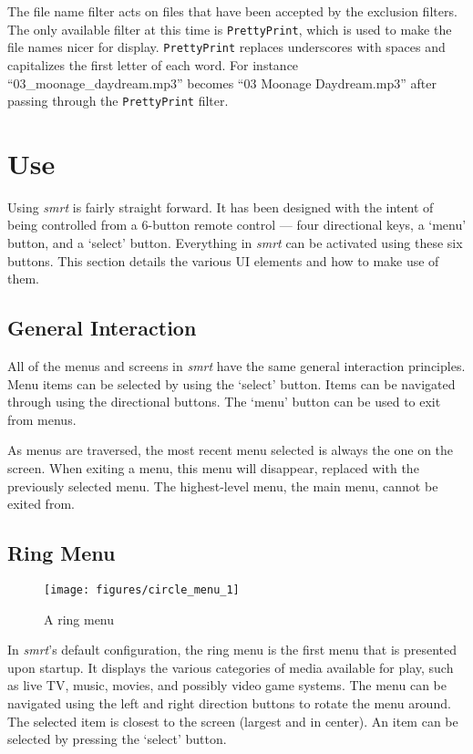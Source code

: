 \documentclass[letterpaper, titlepage, 11pt]{article}
\begin{document}
The file name filter acts on files that have been accepted by the exclusion
filters.  The only available filter at this time is \texttt{PrettyPrint}, which
is used to make the file names nicer for display.  \texttt{PrettyPrint}
replaces underscores with spaces and capitalizes the first letter of each word.
For instance ``03\_moonage\_daydream.mp3'' becomes ``03 Moonage Daydream.mp3''
after passing through the \texttt{PrettyPrint} filter.
  
\section{Use}
\label{sec:use}

Using \textit{smrt} is fairly straight forward.  It has been designed with the
intent of being controlled from a 6-button remote control --- four directional
keys, a `menu' button, and a `select' button.  Everything in \textit{smrt} can be
activated using these six buttons.  This section details the various UI elements
and how to make use of them.

\subsection{General Interaction}
All of the menus and screens in \textit{smrt} have the same general interaction
principles.  Menu items can be selected by using the `select' button.  Items
can be navigated through using the directional buttons.  The `menu' button can
be used to exit from menus.

As menus are traversed, the most recent menu selected is always the one on the
screen.  When exiting a menu, this menu will disappear, replaced with the
previously selected menu.  The highest-level menu, the main menu, cannot be
exited from.


\subsection{Ring Menu}
\label{sec:ring_menu}

\begin{figure}[htb]
\centering
\texttt{[image: figures/circle\_menu\_1]}
\caption{A ring menu\label{fig:ring}}
\end{figure}

In \textit{smrt}'s default configuration, the ring menu is the first menu that
is presented upon startup.  It displays the various categories of media available
for play, such as live TV, music, movies, and possibly video game systems.  The
menu can be navigated using the left and right direction buttons to rotate the
menu around.  The selected item is closest to the screen (largest and in center).
An item can be selected by pressing the `select' button.
\end{document}
